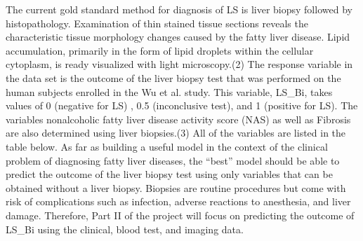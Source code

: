 \documentclass{article}
\begin{document}
The current gold standard method for diagnosis of LS is liver biopsy followed by histopathology. Examination of thin stained tissue sections reveals the characteristic tissue morphology changes caused by the fatty liver disease. Lipid accumulation, primarily in the form of lipid droplets within the cellular cytoplasm, is ready visualized with light microscopy.(2) The response variable in the data set is the outcome of the liver biopsy test that was performed on the human subjects enrolled in the Wu et al. study. This variable, LS\_Bi, takes values of 0 (negative for LS) , 0.5 (inconclusive test), and 1 (positive for LS). The variables nonalcoholic fatty liver disease activity score (NAS) as well as Fibrosis are also determined using liver biopsies.(3) All of the variables are listed in the table below. As far as building a useful model in the context of the clinical problem of diagnosing fatty liver diseases, the “best” model should be able to predict the outcome of the liver biopsy test using only variables that can be obtained without a liver biopsy. Biopsies are routine procedures but come with risk of complications such as infection, adverse reactions to anesthesia, and liver damage. Therefore, Part II of the project will focus on predicting the outcome of LS\_Bi using the clinical, blood test, and imaging data. \\
\end{document}
